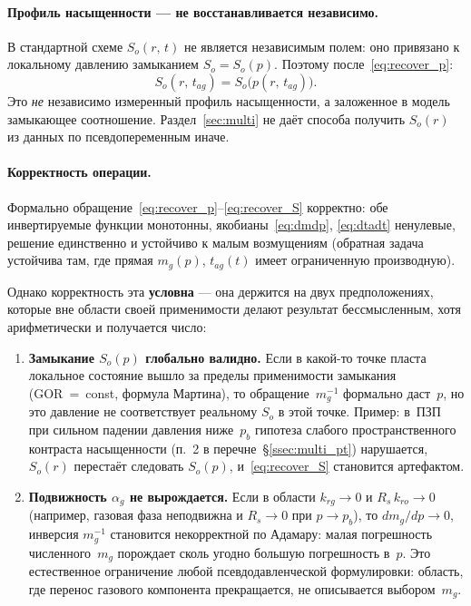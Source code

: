 ﻿\documentclass[12pt,a4paper]{article}
\begin{document}
\paragraph{Профиль насыщенности --- не восстанавливается
независимо.}
В стандартной схеме $S_o(r,\,t)$ не является независимым
полем: оно привязано к локальному давлению замыканием
$S_o = S_o(p)$. Поэтому после~\eqref{eq:recover_p}:
\begin{equation}\label{eq:recover_S}
  S_o(r,\,t_{ag}) = S_o\bigl(p(r,\,t_{ag})\bigr).
\end{equation}
Это \emph{не} независимо измеренный профиль насыщенности,
а заложенное в модель замыкающее соотношение.
Раздел~\ref{sec:multi} не даёт способа получить $S_o(r)$
из данных по псевдопеременным иначе.

\paragraph{Корректность операции.}
Формально обращение~\eqref{eq:recover_p}--\eqref{eq:recover_S}
корректно: обе инвертируемые функции монотонны,
якобианы~\eqref{eq:dmdp}, \eqref{eq:dtadt} ненулевые,
решение единственно и устойчиво к малым возмущениям
(обратная задача устойчива там, где прямая $m_g(p)$, $t_{ag}(t)$
имеет ограниченную производную).

Однако корректность эта \textbf{условна} --- она держится
на двух предположениях, которые вне области своей
применимости делают результат бессмысленным, хотя
арифметически и получается число:

\begin{enumerate}
\item \textbf{Замыкание $S_o(p)$ глобально валидно.}
Если в какой-то точке пласта локальное состояние
вышло за пределы применимости замыкания
(GOR~=~const, формула Мартина), то обращение~$m_g^{-1}$
формально даст~$p$, но это давление не соответствует
реальному $S_o$ в этой точке. Пример: в~ПЗП при сильном
падении давления ниже~$p_b$ гипотеза слабого
пространственного контраста насыщенности
(п.~2 в перечне~\S\ref{ssec:multi_pt}) нарушается,
$S_o(r)$ перестаёт следовать $S_o(p)$, и~\eqref{eq:recover_S}
становится артефактом.

\item \textbf{Подвижность $\alpha_g$ не вырождается.}
Если в области $k_{rg}\to 0$ и $R_s\,k_{ro}\to 0$
(например, газовая фаза неподвижна и $R_s\to 0$
при $p\to p_b$), то $dm_g/dp \to 0$, инверсия $m_g^{-1}$
становится некорректной по Адамару: малая
погрешность численного~$m_g$ порождает сколь угодно
большую погрешность в~$p$. Это естественное
ограничение любой псевдодавленческой формулировки:
область, где перенос газового компонента прекращается,
не описывается выбором~$m_g$.
\end{enumerate}
\end{document}
